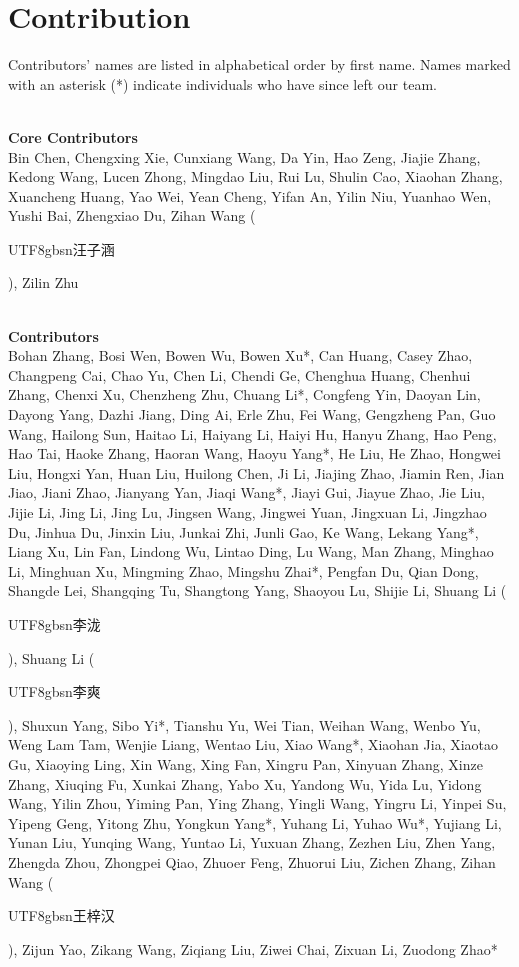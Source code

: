 \newpage
\section{Contribution}
\label{sec:contribution}
\newcommand{\cpara}[1]{~\\\textbf{#1}~\\}
Contributors' names are listed in alphabetical order by first name. Names marked with an asterisk (*) indicate individuals who have since left our team. 

\cpara{Core Contributors}
Bin Chen, Chengxing Xie, Cunxiang Wang, Da Yin, Hao Zeng, Jiajie Zhang, Kedong Wang, Lucen Zhong, Mingdao Liu, Rui Lu, Shulin Cao, Xiaohan Zhang, Xuancheng Huang, Yao Wei, Yean Cheng, Yifan An, Yilin Niu, Yuanhao Wen, Yushi Bai, Zhengxiao Du, Zihan Wang (\begin{CJK*}{UTF8}{gbsn}汪子涵\end{CJK*}), Zilin Zhu

\cpara{Contributors}
Bohan Zhang, Bosi Wen, Bowen Wu, Bowen Xu*, Can Huang, Casey Zhao, Changpeng Cai, Chao Yu, Chen Li, Chendi Ge, Chenghua Huang, Chenhui Zhang, Chenxi Xu, Chenzheng Zhu, Chuang Li*, Congfeng Yin, Daoyan Lin, Dayong Yang, Dazhi Jiang, Ding Ai, Erle Zhu, Fei Wang, Gengzheng Pan, Guo Wang, Hailong Sun, Haitao Li, Haiyang Li, Haiyi Hu, Hanyu Zhang, Hao Peng, Hao Tai, Haoke Zhang, Haoran Wang, Haoyu Yang*, He Liu, He Zhao, Hongwei Liu, Hongxi Yan, Huan Liu, Huilong Chen, Ji Li, Jiajing Zhao, Jiamin Ren, Jian Jiao, Jiani Zhao, Jianyang Yan, Jiaqi Wang*, Jiayi Gui, Jiayue Zhao, Jie Liu, Jijie Li, Jing Li, Jing Lu, Jingsen Wang, Jingwei Yuan, Jingxuan Li, Jingzhao Du, Jinhua Du, Jinxin Liu, Junkai Zhi, Junli Gao, Ke Wang, Lekang Yang*, Liang Xu, Lin Fan, Lindong Wu, Lintao Ding, Lu Wang, Man Zhang, Minghao Li, Minghuan Xu, Mingming Zhao, Mingshu Zhai*, Pengfan Du, Qian Dong, Shangde Lei, Shangqing Tu, Shangtong Yang, Shaoyou Lu, Shijie Li, Shuang Li (\begin{CJK*}{UTF8}{gbsn}李泷\end{CJK*}), Shuang Li (\begin{CJK*}{UTF8}{gbsn}李爽\end{CJK*}), Shuxun Yang, Sibo Yi*, Tianshu Yu, Wei Tian, Weihan Wang, Wenbo Yu, Weng Lam Tam, Wenjie Liang, Wentao Liu, Xiao Wang*, Xiaohan Jia, Xiaotao Gu, Xiaoying Ling, Xin Wang, Xing Fan, Xingru Pan, Xinyuan Zhang, Xinze Zhang, Xiuqing Fu, Xunkai Zhang, Yabo Xu, Yandong Wu, Yida Lu, Yidong Wang, Yilin Zhou, Yiming Pan, Ying Zhang, Yingli Wang, Yingru Li, Yinpei Su, Yipeng Geng, Yitong Zhu, Yongkun Yang*, Yuhang Li, Yuhao Wu*, Yujiang Li, Yunan Liu, Yunqing Wang, Yuntao Li, Yuxuan Zhang, Zezhen Liu, Zhen Yang, Zhengda Zhou, Zhongpei Qiao, Zhuoer Feng, Zhuorui Liu, Zichen Zhang, Zihan Wang (\begin{CJK*}{UTF8}{gbsn}王梓汉\end{CJK*}), Zijun Yao, Zikang Wang, Ziqiang Liu, Ziwei Chai, Zixuan Li, Zuodong Zhao*

